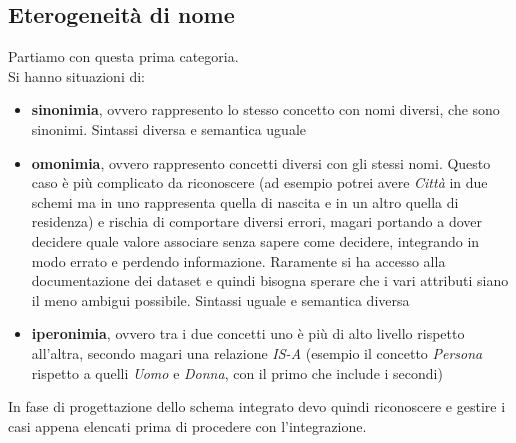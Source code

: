 \documentclass[a4paper,12pt, oneside]{book}
\begin{document}
\subsection{Eterogeneità di nome}
Partiamo con questa prima categoria. \\
Si hanno situazioni di:
\begin{itemize}
  \item \textbf{sinonimia}, ovvero rappresento lo stesso concetto con nomi
  diversi, che sono sinonimi. Sintassi diversa e semantica uguale
  \item \textbf{omonimia}, ovvero rappresento concetti diversi con gli stessi
  nomi. Questo caso è più complicato da riconoscere (ad esempio potrei avere
  \textit{Città} in due schemi ma in uno rappresenta quella di nascita e in un
  altro quella di residenza) e rischia di comportare diversi errori, magari
  portando a dover decidere quale valore associare senza sapere come decidere,
  integrando in modo errato e perdendo informazione. Raramente si ha accesso
  alla documentazione dei dataset e quindi bisogna sperare che i vari attributi
  siano il meno ambigui possibile. Sintassi uguale e semantica diversa
  \item \textbf{iperonimia}, ovvero tra i due concetti uno è più di alto livello
  rispetto all'altra, secondo magari una relazione \textit{IS-A} (esempio il
  concetto \textit{Persona} rispetto a quelli \textit{Uomo} e \textit{Donna},
  con il primo che include i secondi)
\end{itemize}
In fase di progettazione dello schema integrato devo quindi riconoscere e
gestire i casi appena elencati prima di procedere con l'integrazione.
\end{document}
